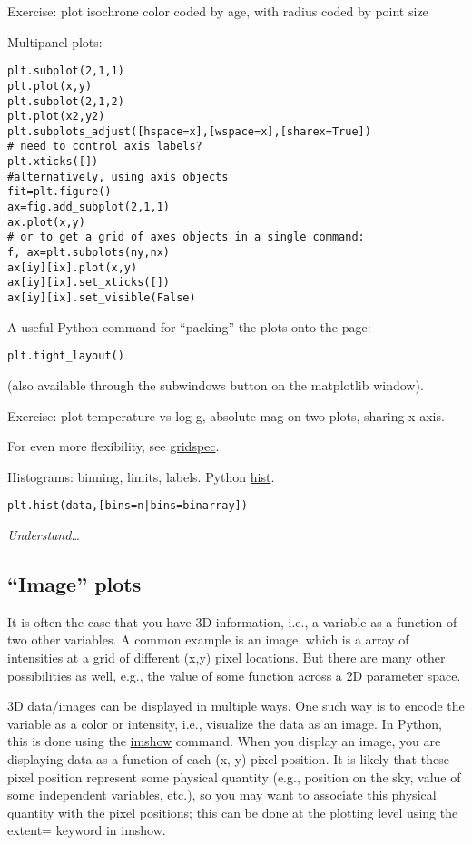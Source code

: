 \documentclass{article}
\newcommand{\test}[1]{%
    \begin{center}
        \colorbox{hl}{\parbox{0.9\textwidth}{\emph{#1}}}
    \end{center}}
\begin{document}
Exercise: plot isochrone color coded by age, with radius coded by
point size

Multipanel plots:
\begin{verbatim}
plt.subplot(2,1,1)
plt.plot(x,y)
plt.subplot(2,1,2)
plt.plot(x2,y2)
plt.subplots_adjust([hspace=x],[wspace=x],[sharex=True])
# need to control axis labels?
plt.xticks([])
#alternatively, using axis objects
fit=plt.figure()
ax=fig.add_subplot(2,1,1)
ax.plot(x,y)
# or to get a grid of axes objects in a single command:
f, ax=plt.subplots(ny,nx)
ax[iy][ix].plot(x,y)
ax[iy][ix].set_xticks([])
ax[iy][ix].set_visible(False)
\end{verbatim}
A useful Python command for ``packing'' the plots onto the page:
\begin{verbatim}
plt.tight_layout()
\end{verbatim}
(also available through the subwindows button on the matplotlib
window).

Exercise: plot temperature vs log g, absolute mag on two plots,
sharing x axis.

For even more flexibility, see
\href{http://matplotlib.org/users/gridspec.html}{gridspec}.

Histograms: binning, limits, labels. Python
\href{http://matplotlib.org/api/pyplot_api.html#matplotlib.pyplot.hist}
{hist}.
\begin{verbatim}
plt.hist(data,[bins=n|bins=binarray])
\end{verbatim}

\test{Understand\ldots}

\subsection{``Image'' plots}

It is often the case that you have 3D information, i.e., a variable as
a function of two other variables. A common example is an image, which
is a array of intensities at a grid of different (x,y) pixel
locations. But there are many other possibilities as well, e.g., the
value of some function across a 2D parameter space.

3D data/images can be displayed in multiple ways. One such way is to
encode the variable as a color or intensity, i.e., visualize the data
as an image. In Python, this is done using the
\href{http://matplotlib.org/api/pyplot_api.html#matplotlib.pyplot.imshow}
{imshow} command. When
you display an image, you are displaying data as a function of each
(x, y) pixel position. It is likely that these pixel position
represent some physical quantity (e.g., position on the sky, value of
some independent variables, etc.), so you may want to associate this
physical quantity with the pixel positions; this can be done at the
plotting level using the extent= keyword in imshow.
\end{document}
